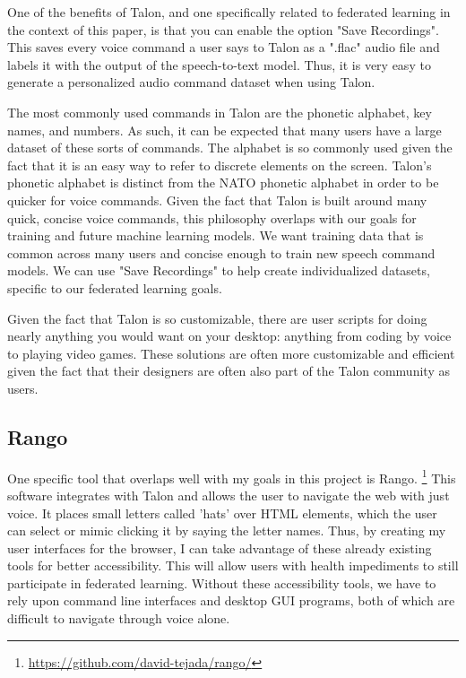 \documentclass[manuscript,screen,review]{acmart}
\begin{document}
One of the benefits of Talon, and one specifically related to federated learning in the context of this paper, is that you can enable the option "Save Recordings". This saves every voice command a user says to Talon as a ".flac" audio file and labels it with the output of the speech-to-text model. Thus, it is very easy to generate a personalized audio command dataset when using Talon.

The most commonly used commands in Talon are the phonetic alphabet, key names, and numbers. As such, it can be expected that many users have a large dataset of these sorts of commands. The alphabet is so commonly used given the fact that it is an easy way to refer to discrete elements on the screen. Talon's phonetic alphabet is distinct from the NATO phonetic alphabet in order to be quicker for voice commands. Given the fact that Talon is built around many quick, concise voice commands, this philosophy overlaps with our goals for training and future machine learning models. We want training data that is common across many users and concise enough to train new speech command models. We can use "Save Recordings" to help create individualized datasets, specific to our federated learning goals.



Given the fact that Talon is so customizable, there are user scripts for doing nearly anything you would want on your desktop: anything from coding by voice to playing video games. These solutions are often more customizable and efficient given the fact that their designers are often also part of the Talon community as users.

\subsection{Rango}

One specific tool that overlaps well with my goals in this project is Rango. \footnote{\url{https://github.com/david-tejada/rango/}} This software integrates with Talon and allows the user to navigate the web with just voice. It places small letters called 'hats' over HTML elements, which the user can select or mimic clicking it by saying the letter names. Thus, by creating my user interfaces for the browser, I can take advantage of these already existing tools for better accessibility. This will allow users with health impediments to still participate in federated learning. Without these accessibility tools, we have to rely upon command line interfaces and desktop GUI programs, both of which are difficult to navigate through voice alone.
\end{document}
